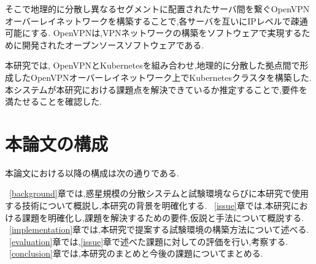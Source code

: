 そこで地理的に分散し異なるセグメントに配置されたサーバ間を繋ぐOpenVPNオーバーレイネットワークを構築することで,各サーバを互いにIPレベルで疎通可能にする.
OpenVPNは,VPNネットワークの構築をソフトウェアで実現するために開発されたオープンソースソフトウェアである.

本研究では, OpenVPNとKubernetesを組み合わせ,地理的に分散した拠点間で形成したOpenVPNオーバーレイネットワーク上でKubernetesクラスタを構築した.
本システムが本研究における課題点を解決できているか推定することで,要件を満たせることを確認した.

\section{本論文の構成}
\label{introduction:structure}

本論文における以降の構成は次の通りである.

~\ref{background}章では,惑星規模の分散システムと試験環境ならびに本研究で使用する技術について概説し,本研究の背景を明確化する.
~\ref{issue}章では,本研究における課題を明確化し,課題を解決するための要件,仮説と手法について概説する.
~\ref{implementation}章では,本研究で提案する試験環境の構築方法について述べる.
~\ref{evaluation}章では,\ref{issue}章で述べた課題に対しての評価を行い,考察する.
~\ref{conclusion}章では,本研究のまとめと今後の課題についてまとめる.

